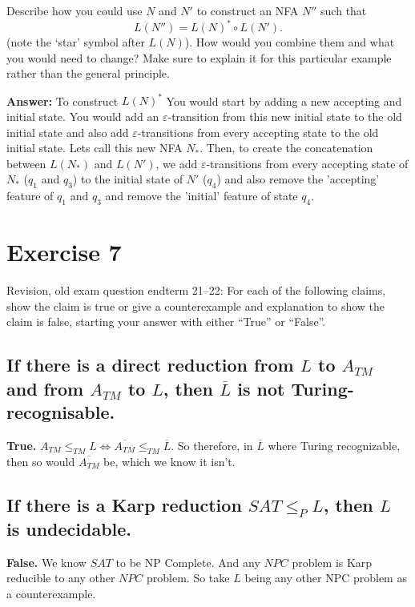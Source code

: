 \documentclass[a4paper,11pt]{article}
\newcommand{\eps}{\varepsilon}
\begin{document}
	Describe how you could use $N$ and $N'$ to construct an NFA $N''$ such that
	\[
	L(N'') = L(N)^* \circ L(N').
	\]
	(note the `star' symbol after $L(N)$). How would you combine them and what you would need to change? Make sure to explain it for this particular example rather than the general principle.

	\textbf{Answer: }To construct $L(N)^*$ You would start by adding a new accepting and initial state. You would add an $\eps$-transition from this new initial state to the old initial state and also add $\eps$-transitions from every accepting state to the old initial state. Lets call this new NFA $N_*$. Then, to create the concatenation between $L(N_*)$ and $L(N')$, we add $\eps$-transitions from every accepting state of $N_*$ ($q_1$ and $q_3$) to the initial state of $N'$ ($q_4$) and also remove the 'accepting' feature of $q_1$ and $q_3$ and remove the 'initial' feature of state $q_4$.

	\section{Exercise 7}
	Revision, old exam question endterm 21--22: For each of the following claims, show the claim is true or give a counterexample and explanation to show the claim is false, starting your answer with either ``True'' or ``False''.

	\subsection{If there is a direct reduction from $L$ to $A_{TM}$ and from $A_{TM}$ to $L$, then $\overline{L}$ is not Turing-recognisable.}

	\textbf{True. }$A_{TM}\leq_{TM}L\iff \overline{A_{TM}}\leq_{TM}\overline{L}$. So therefore, in $\overline{L}$ where Turing recognizable, then so would $\overline{A_{TM}}$ be, which we know it isn't.

	\subsection{If there is a Karp reduction $SAT \leq_P L$, then $L$ is undecidable.}

	\textbf{False. } We know $SAT$ to be NP Complete. And any $NPC$ problem is Karp reducible to any other $NPC$ problem. So take $L$ being any other NPC problem as a counterexample.
\end{document}
